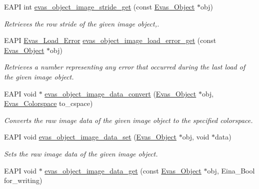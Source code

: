 \begin{DoxyCompactItemize}
EAPI int \hyperlink{group__Evas__Object__Image_gab72175381532640c620dd032e56c590b}{evas\_\-object\_\-image\_\-stride\_\-get} (const \hyperlink{group__Evas__Object__Group_ga9e19e6dd1f517a0ba437c0114d3e7c97}{Evas\_\-Object} $\ast$obj)
\begin{DoxyCompactList}\small\item\em Retrieves the row stride of the given image object,. \item\end{DoxyCompactList}\item 
EAPI \hyperlink{Evas_8h_aff351ae694a58aecd7834ef12bdf3d64}{Evas\_\-Load\_\-Error} \hyperlink{group__Evas__Object__Image_ga46e4a0b2b916d28694ad054549f88e24}{evas\_\-object\_\-image\_\-load\_\-error\_\-get} (const \hyperlink{group__Evas__Object__Group_ga9e19e6dd1f517a0ba437c0114d3e7c97}{Evas\_\-Object} $\ast$obj)
\begin{DoxyCompactList}\small\item\em Retrieves a number representing any error that occurred during the last load of the given image object. \item\end{DoxyCompactList}\item 
EAPI void $\ast$ \hyperlink{group__Evas__Object__Image_ga3072cf7c31cf33057abd8ae8876218cd}{evas\_\-object\_\-image\_\-data\_\-convert} (\hyperlink{group__Evas__Object__Group_ga9e19e6dd1f517a0ba437c0114d3e7c97}{Evas\_\-Object} $\ast$obj, \hyperlink{group__Evas__Object__Image_ga8c6e60db9c8b83b155ccea52957ff656}{Evas\_\-Colorspace} to\_\-cspace)
\begin{DoxyCompactList}\small\item\em Converts the raw image data of the given image object to the specified colorspace. \item\end{DoxyCompactList}\item 
EAPI void \hyperlink{group__Evas__Object__Image_gabdd65e4c69f422ddcf0d3c8720859a92}{evas\_\-object\_\-image\_\-data\_\-set} (\hyperlink{group__Evas__Object__Group_ga9e19e6dd1f517a0ba437c0114d3e7c97}{Evas\_\-Object} $\ast$obj, void $\ast$data)
\begin{DoxyCompactList}\small\item\em Sets the raw image data of the given image object. \item\end{DoxyCompactList}\item 
EAPI void $\ast$ \hyperlink{group__Evas__Object__Image_gabe5883e22418071463f4ae97ca8885b2}{evas\_\-object\_\-image\_\-data\_\-get} (const \hyperlink{group__Evas__Object__Group_ga9e19e6dd1f517a0ba437c0114d3e7c97}{Evas\_\-Object} $\ast$obj, Eina\_\-Bool for\_\-writing)

\end{DoxyCompactItemize}
